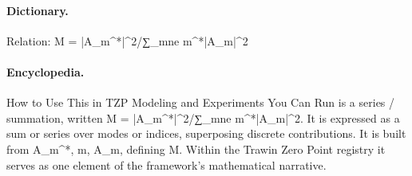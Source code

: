 \paragraph{Dictionary.}
Relation: M = |A\_m\textasciicircum{}*|\textasciicircum{}2/∑\_mne m\textasciicircum{}*|A\_m|\textasciicircum{}2

\paragraph{Encyclopedia.}
How to Use This in TZP Modeling and Experiments You Can Run is a series / summation, written M = |A\_m\textasciicircum{}*|\textasciicircum{}2/∑\_mne m\textasciicircum{}*|A\_m|\textasciicircum{}2. It is expressed as a sum or series over modes or indices, superposing discrete contributions. It is built from A\_m\textasciicircum{}*, m, A\_m, defining M. Within the Trawin Zero Point registry it serves as one element of the framework's mathematical narrative.

